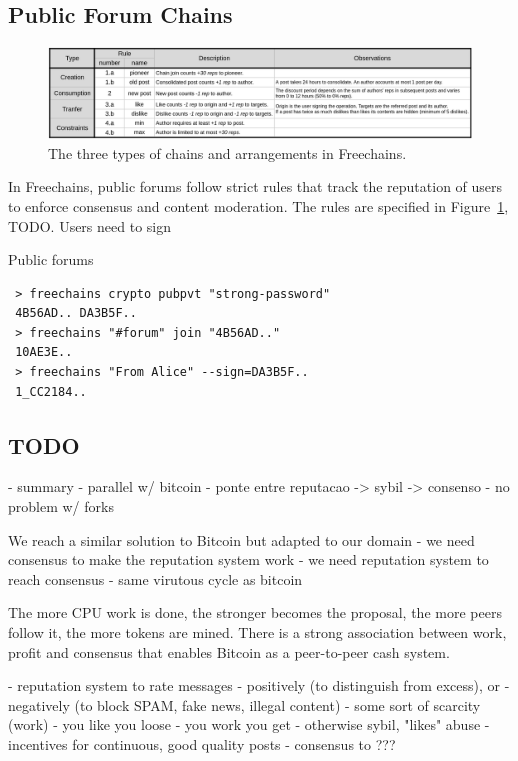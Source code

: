 \documentclass[10pt,journal,compsoc]{IEEEtran}
\newcommand{\FC}   {Freechains\xspace}
\begin{document}
\subsection{Public Forum Chains}

\begin{figure}[ht]
\centering
\includegraphics[width=\textwidth]{rules.png}
\caption{The three types of chains and arrangements in \FC.}
\label{fig.rules}
\end{figure}

In \FC, public forums follow strict rules that track the reputation of users to
enforce consensus and content moderation.
The rules are specified in Figure~\ref{fig.rules}, TODO.
Users need to sign

Public forums

{\footnotesize
\begin{verbatim}
 > freechains crypto pubpvt "strong-password"
 4B56AD.. DA3B5F..
 > freechains "#forum" join "4B56AD.."
 10AE3E..
 > freechains "From Alice" --sign=DA3B5F..
 1_CC2184..
\end{verbatim}
}


\subsection{TODO}

- summary
    - parallel w/ bitcoin
        - ponte entre reputacao -> sybil -> consenso
    - no problem w/ forks

We reach a similar solution to Bitcoin but adapted to our domain
- we need consensus to make the reputation system work
- we need reputation system to reach consensus
- same virutous cycle as bitcoin

The more CPU work is done, the stronger becomes the proposal, the more peers
follow it, the more tokens are mined.
There is a strong association between work, profit and consensus that enables
Bitcoin as a peer-to-peer cash system.

- reputation system to rate messages
    - positively (to distinguish from excess), or
    - negatively (to block SPAM, fake news, illegal content)
- some sort of scarcity (work)
    - you like you loose
    - you work you get
    - otherwise sybil, "likes" abuse
    - incentives for continuous, good quality posts
- consensus to ???
\end{document}
